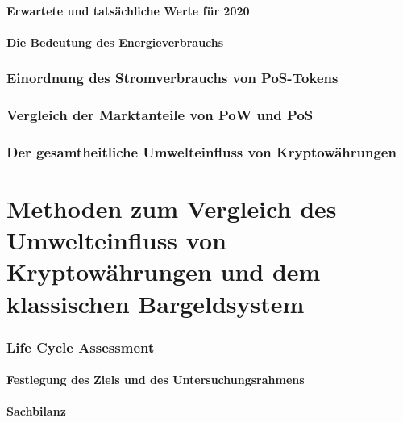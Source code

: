 \documentclass[12pt]{article}
\begin{document}
\subsection{Erwartete und tatsächliche Werte für 2020}


\subsection{Die Bedeutung des Energieverbrauchs}


\section{Einordnung des Stromverbrauchs von PoS-Tokens}


\section{Vergleich der Marktanteile von PoW und PoS}


\section{Der gesamtheitliche Umwelteinfluss von Kryptowährungen}


\part{Methoden zum Vergleich des Umwelteinfluss von Kryptowährungen und dem klassischen Bargeldsystem}

\section{Life Cycle Assessment}


\subsection{Festlegung des Ziels und des Untersuchungsrahmens}


\subsection{Sachbilanz}

\end{document}
